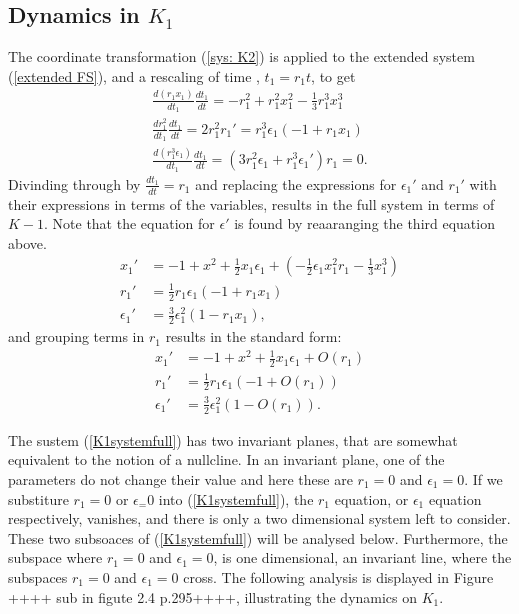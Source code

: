 \subsection{Dynamics in \texorpdfstring{$K_1$}{K1}}\label{sec:dynamics-in-texorpdfstringk1k1} 
The coordinate transformation (\ref{sys: K2}) is applied to the extended system (\ref{extended FS}), and a rescaling of time , $t_1=r_1t$, to get
\begin{align*}
\frac{d(r_1x_1)}{dt_1} \frac{dt_1}{dt} = -r_1^2 + r_1^2x_1^2 - \frac{1}{3}r_1^3x_1^3\\
\frac{dr_1^2}{dt_1}\frac{dt_1}{dt}= 2r_1^2r_1' = r_1^3 \epsilon_1 (-1 +r_1 x_1)\\
\frac{d(r_1^3 \epsilon_1)}{dt_1}\frac{dt_1}{dt}= (3r_1^2\epsilon_1 + r_1^3 \epsilon_1') r_1 = 0.
\end{align*}
Divinding through by $\frac{dt_1}{dt}=r_1$ and replacing the expressions for $\epsilon_1'$ and $r_1'$ with their expressions in terms of the variables, results in the full system in terms of $K-1$. Note that the equation for $\epsilon'$ is found by reaaranging the third equation above. 
\begin{align*}
x_1' &= -1 +x^2 + \frac{1}{2} x_1 \epsilon_1 + \left( - \frac{1}{2} \epsilon_1 x_1^2r_1 - \frac{1}{3} x_1^3 \right)\\
r_1' &= \frac{1}{2} r_1 \epsilon_1( -1 + r_1 x_1)\\
\epsilon_1' &= \frac{3}{2} \epsilon_1^2 ( 1- r_1x_1),
\end{align*}
and grouping terms in $r_1$ results in the standard form:
\begin{align} \label{K1systemfull}
x_1' &= -1 +x^2 + \frac{1}{2} x_1 \epsilon_1 +O(r_1)\\
r_1' &= \frac{1}{2} r_1 \epsilon_1( -1 + O(r_1))\\
\epsilon_1' &= \frac{3}{2} \epsilon_1^2 ( 1- O(r_1)).
\end{align}

The sustem (\ref{K1systemfull}) has two invariant planes, that are somewhat equivalent to the notion of a nullcline. In an invariant plane, one of the parameters do not change their value and here these are $r_1=0$ and $\epsilon_1=0$.
If we substiture $r_1=0$ or $\epsilon_ =0$ into (\ref{K1systemfull}), the $r_1$ equation, or $\epsilon_1$ equation respectively, vanishes, and there is only a two dimensional system left to consider.
These two subsoaces of (\ref{K1systemfull}) will be analysed below. Furthermore, the subspace where $r_1=0$ and $\epsilon_1=0$, is one dimensional, an invariant line, where the subspaces $r_1=0$ and $\epsilon_1=0$ cross.
The following analysis is displayed in Figure ++++ sub in figute 2.4 p.295++++, illustrating the dynamics on $K_1$.


